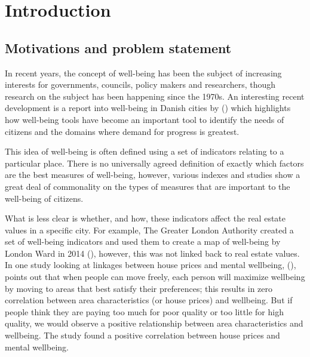 
\chapter{Introduction} %

\label{Chapter1} %


\section{Motivations and problem statement}

In recent years, the concept of well-being has been the subject of increasing interests for governments, councils, policy makers and researchers, though research on the subject has been happening since the 1970s.
An interesting recent development is a report into well-being in Danish cities by (\cite {OECD16}) which highlights how well-being tools have become an important tool to identify the needs of citizens and the domains where demand for progress is greatest. 

This idea of well-being is often defined using a set of indicators relating to a particular place. There is no universally agreed definition of exactly which factors are the best measures of well-being, however, various indexes and studies show a great deal of commonality on the types of measures that are important to the well-being of citizens.

What is less clear is whether, and how, these indicators affect the real estate values in a specific city. For example, The Greater London Authority created a set of well-being indicators and used them to create a map of well-being by London Ward in 2014 (\cite{GLA14}), however, this was not linked back to real estate values.
In one study looking at linkages between house prices and mental wellbeing, (\cite {AR13}), points out that when people can move freely, each person will maximize wellbeing by moving to areas that best satisfy their preferences; this results in zero correlation between area characteristics (or house prices) and wellbeing. But if people think they are paying too much for poor quality or too little for high quality, we would observe a positive relationship between area characteristics and wellbeing. The study found a positive correlation between house prices and mental wellbeing.

